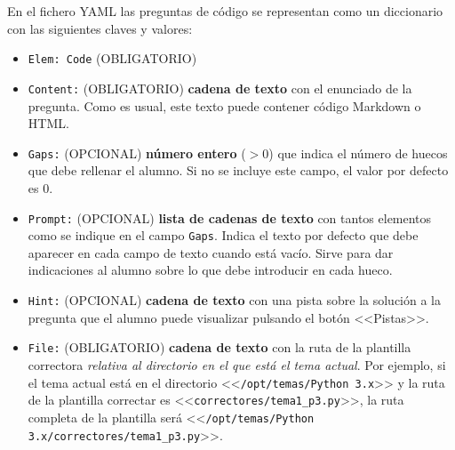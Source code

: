 \documentclass[]{article}
\newcommand{\code}[1]{{\lstinline[basicstyle=\ttfamily,mathescape]!#1!}}
\begin{document}
En el fichero YAML las preguntas de código se representan como un diccionario con las siguientes claves y valores:
\begin{itemize}
	\item \code{Elem: Code} {\sf (OBLIGATORIO)}
	\item \code{Content:} {\sf (OBLIGATORIO)} \textbf{cadena de texto} con el enunciado de la pregunta. Como es usual, este texto puede contener código Markdown o HTML. 
	\item \code{Gaps:} {\sf (OPCIONAL)} \textbf{número entero} ($> 0$) que indica el número de huecos que debe rellenar el alumno. Si no se incluye este campo, el valor por defecto es $0$.	
	\item \code{Prompt:} {\sf (OPCIONAL)} \textbf{lista de cadenas de texto} con tantos elementos como se indique en el campo \code{Gaps}. Indica el texto por defecto que debe aparecer en cada campo de texto cuando está vacío. Sirve para dar indicaciones al alumno sobre lo que debe introducir en cada hueco.
	\item \code{Hint:}  {\sf (OPCIONAL)} \textbf{cadena de texto} con una pista sobre la solución a la pregunta que el alumno puede visualizar pulsando el botón <<Pistas>>.
	\item \code{File:} {\sf (OBLIGATORIO)} \textbf{cadena de texto} con la ruta de la plantilla correctora \emph{relativa al directorio en el que está el tema actual}. Por ejemplo, si el tema actual está en el directorio <<\code{/opt/temas/Python 3.x}>> y la ruta de la plantilla correctar es <<\code{correctores/tema1_p3.py}>>, la ruta completa de la plantilla será <<\code{/opt/temas/Python 3.x/correctores/tema1_p3.py}>>.
\end{itemize}
\end{document}
